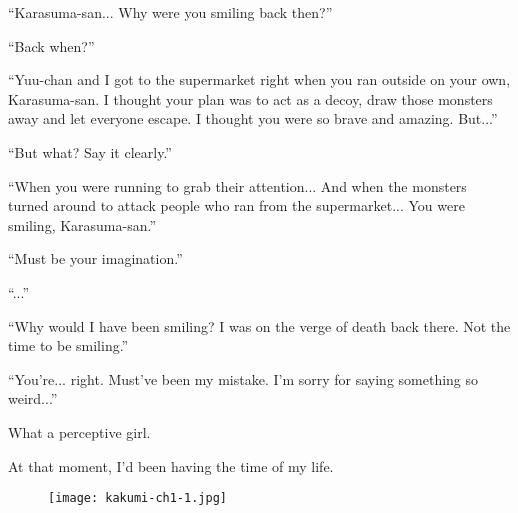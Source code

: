 ``Karasuma-san... Why were you smiling back then?''

``Back when?''

``Yuu-chan and I got to the supermarket right when you ran outside on your own, Karasuma-san. I thought your plan was to act as a decoy, draw those monsters away and let everyone escape. I thought you were so brave and amazing. But...''

``But what? Say it clearly.''

``When you were running to grab their attention... And when the monsters turned around to attack people who ran from the supermarket... You were smiling, Karasuma-san.''

``Must be your imagination.''

``...''

``Why would I have been smiling? I was on the verge of death back there. Not the time to be smiling.''

``You're... right. Must've been my mistake. I'm sorry for saying something so weird...''

What a perceptive girl.

At that moment, I'd been having the time of my life.

\begin{figure}[p]
\texttt{[image: kakumi-ch1-1.jpg]}
\end{figure}
